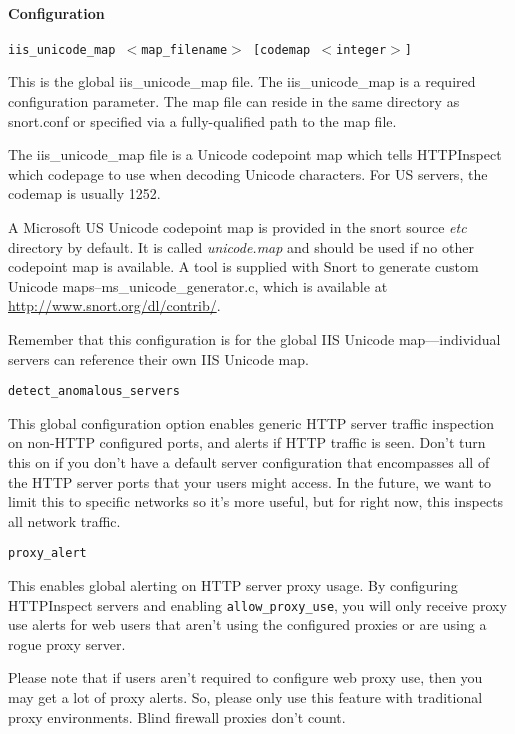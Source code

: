 \documentclass[english]{report}
\newcounter{slistnum}
\newenvironment{slist}
{ \begin{list}{ {\bf \arabic{slistnum}.} }{\usecounter{slistnum} } }
{ \end{list} }
\newenvironment{note}{
\samepage
    \vspace{10pt}{\textsf{
        {\hspace{7pt}\Huge{$\triangle$\hspace{-12.5pt}{\Large{$^!$}}}}\hspace{5pt}
        {\Large{NOTE}}
    }
    }
   \begin{center}
    \par\vspace{-17pt}

    \begin{lrbox}{\savepar}
    \begin{minipage}[r]{6in}
}
{
    \end{minipage}
    \end{lrbox}
    \fbox{
        \usebox{
            \savepar
        }
    }
    \par\vskip10pt
    \end{center}
}
\begin{document}
\paragraph{Configuration}
\begin{slist}
\item \texttt{iis\_unicode\_map $<$map\_filename$>$ [codemap $<$integer$>$]}

This is the global iis\_unicode\_map file.  The iis\_unicode\_map is a required
configuration parameter.  The map file can reside in the same directory as
snort.conf or specified via a fully-qualified path to the map file.

The iis\_unicode\_map file is a Unicode codepoint map which tells HTTPInspect
which codepage to use when decoding Unicode characters.  For US servers, the
codemap is usually 1252.

A Microsoft US Unicode codepoint map is provided in the snort source \emph{etc}
directory by default.  It is called \emph{unicode.map} and should be used if no
other codepoint map is available.  A tool is supplied with Snort to generate
custom Unicode maps--ms\_unicode\_generator.c, which is available at
\url{http://www.snort.org/dl/contrib/}.

\begin{note}
Remember that this configuration is for the global IIS Unicode map---individual
servers can reference their own IIS Unicode map.
\end{note}

\item \texttt{detect\_anomalous\_servers}

This global configuration option enables generic HTTP server traffic
inspection on non-HTTP configured ports, and alerts if HTTP traffic is seen.
Don't turn this on if you don't have a default server configuration that
encompasses all of the HTTP server ports that your users might access.  In the
future, we want to limit this to specific networks so it's more useful, but
for right now, this inspects all network traffic.

\item \texttt{proxy\_alert}

This enables global alerting on HTTP server proxy usage.  By configuring
HTTPInspect servers and enabling \texttt{allow\_proxy\_use}, you will only receive proxy
use alerts for web users that aren't using the configured proxies or are using
a rogue proxy server.

Please note that if users aren't required to configure web proxy use, then
you may get a lot of proxy alerts.  So, please only use this feature with
traditional proxy environments. Blind firewall proxies don't count.

\end{slist}
\end{document}
